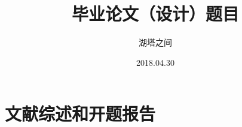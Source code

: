 \documentclass[fangfont=STFANGSO.TTF,heifont=simhei.ttf]{zju-thesis}
\title{毕业论文（设计）题目}{浙江大学本科生毕业论文（设计）}
\author{湖塔之间}{3140100000}
\date{2018.04.30}
\begin{document}
	\makecover
	
	
	\clearpage
	
    \tableofcontents
	\begin{refsection}
	
	\end{refsection}
	
	
	
	\part{文献综述和开题报告}
	\renewcommand\thechapter{\zhnum{chapter}、} 
	
\end{document}
